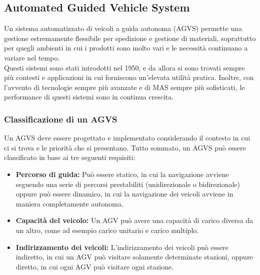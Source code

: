 \documentclass[12pt]{article}
\begin{document}
\newpage

\subsection{Automated Guided Vehicle System}
\noindent Un sistema automatizzato di veicoli a guida autonoma (AGVS) permette una gestione estremamente flessibile per spedizione e gestione di materiali, soprattutto per quegli ambienti in cui i prodotti sono molto vari e le necessità continuano a variare nel tempo. \\

\noindent Questi sistemi sono stati introdotti nel 1950, e da allora si sono trovati sempre più contesti e applicazioni in cui forniscono un'elevata utilità pratica. Inoltre, con l'avvento di tecnologie sempre più avanzate e di MAS sempre più sofisticati, le performance di questi sistemi sono in continua crescita.

\subsubsection{Classificazione di un AGVS}
Un AGVS deve essere progettato e implementato considerando il contesto in cui ci si trova e le priorità che si presentano. Tutto sommato, un AGVS può essere classificato in base ai tre seguenti requisiti:
\begin{itemize}
\item \textbf{Percorso di guida:} Può essere statico, in cui la navigazione avviene seguendo una serie di percorsi prestabiliti (unidirezionale o bidirezionale) oppure può essere dinamico, in cui la navigazione dei veicoli avviene in maniera completamente autonoma.

\item \textbf{Capacità del veicolo:} Un AGV può avere una capacità di carico diversa da un altro, come ad esempio carico unitario e carico multiplo.

\item \textbf{Indirizzamento dei veicoli:} L'indirizzamento dei veicoli può essere indiretto, in cui un AGV può visitare solamente determinate stazioni, oppure diretto, in cui ogni AGV può visitare ogni stazione.

\end{itemize}
\end{document}
